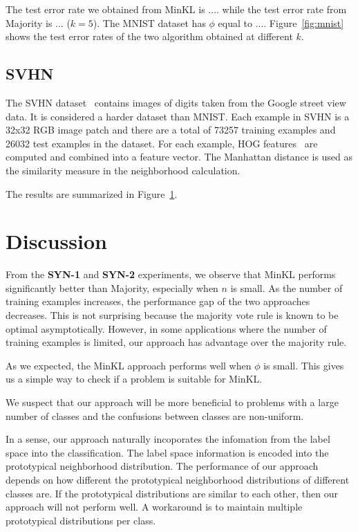 \documentclass{article}
\begin{document}
The test error rate we obtained from MinKL is .... while the test
error rate from Majority is ... ($k = 5$). The MNIST dataset has
$\phi$ equal to .... Figure~\ref{fig:mnist} shows the test error rates
of the two algorithm obtained at different $k$.

\subsection{SVHN}
The SVHN dataset~\cite{Netzer2011} contains images of digits taken
from the Google street view data. It is considered a harder dataset
than MNIST. Each example in SVHN is a 32x32 RGB image patch and there
are a total of 73257 training examples and 26032 test examples in the
dataset. For each example, HOG features~\cite{Dalal2005} are computed
and combined into a feature vector. The Manhattan distance is used as
the similarity measure in the neighborhood calculation.

The results are summarized in Figure~\ref{}.

\section{Discussion}

From the \textbf{SYN-1} and \textbf{SYN-2} experiments, we observe
that MinKL performs significantly better than Majority, especially
when $n$ is small. As the number of training examples increases, the
performance gap of the two approaches decreases. This is not
surprising because the majority vote rule is known to be optimal
asymptotically. However, in some applications where the number of
training examples is limited, our approach has advantage over the
majority rule.

As we expected, the MinKL approach performs well when $\phi$ is
small. This gives us a simple way to check if a problem is suitable
for MinKL. 


We suspect that our approach will be more beneficial to problems with
a large number of classes and the confusions between classes are
non-uniform.


In a sense, our approach naturally incoporates the infomation from the
label space into the classification. The label space information is
encoded into the prototypical neighborhood distribution. The
performance of our approach depends on how different the prototypical
neighborhood distributions of different classes are. If the
prototypical distributions are similar to each other, then our
approach will not perform well. A workaround is to maintain multiple
prototypical distributions per class.
\end{document}
